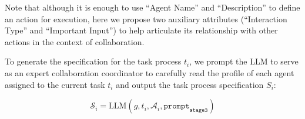 Note that although it is enough to use ``Agent Name'' and ``Description'' to define an action for execution, here we propose two auxiliary attributes (``Interaction Type'' and ``Important Input'') to help articulate its relationship with other actions in the context of collaboration. 

To generate the specification for the task process $t_{i}$, we prompt the LLM to serve as an expert collaboration coordinator to carefully read the profile of each agent assigned to the current task $t_{i}$ and output the task process specification ${S}_{i}$:


\begin{equation}
         \mathcal{S}_{i} = \text{LLM} ( g, t_{i}, \mathcal{A}_{i}, \texttt{prompt}_\texttt{stage3}) 
\end{equation}


